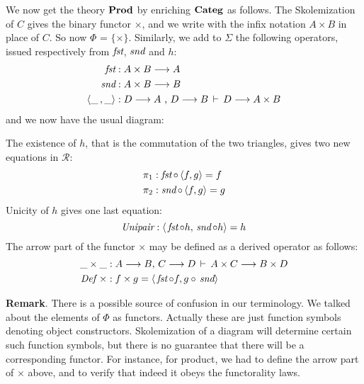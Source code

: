 \begin{center}
\end{center}

We now get the theory ${\mathbf {Prod}}$ by enriching ${\mathbf {Categ}}$ as follows. The Skolemization of $C$ gives the
binary functor $\times$, and we write with the infix notation 
$A \times B$ in place of $C$. So now $\Phi$ = $\{\times\}$.
Similarly, we add to $\Sigma$ the following operators,
issued respectively from $\mathop{\text{\it fst}}$, $\mathop{\text{\it snd}}$ and $h$:
\begin{align*}
\mathop{\text{\it fst}} &: A \times B \longrightarrow A\\
\mathop{\text{\it snd}} &: A \times B \longrightarrow B\\
\langle \_\,, \_ \rangle &: D\longrightarrow A \text{ , } D \longrightarrow B \,\vdash\, D \longrightarrow A \times B
\end{align*}
and we now have the usual diagram:
\begin{center}
\end{center}
The existence of $h$, that is the commutation of the two triangles,
gives two new equations in $\mathcal R$:
\begin{align*}
\pi_1 &: \mathop{\text{\it fst}} \circ\, \langle f, g \rangle = f\\
\pi_2 &: \mathop{\text{\it snd}} \circ\, \langle f, g \rangle = g
\end{align*}
Unicity of $h$ gives one last equation:
\[
\text{\it Unipair} : \langle \,\mathop{\text{\it fst}} \circ h, \,\mathop{\text{\it snd}} \circ h \rangle = h
\]
The arrow part of the functor $\times$ may be defined as a derived operator as follows:
\begin{align*}
\_ \times \_  &: A\longrightarrow B , \, C \longrightarrow D \, \vdash \, A\times C \longrightarrow B \times D\\
\text{\it Def } \times &: f \times g = \langle \,\mathop{\text{\it fst}} \circ f, g\circ \, \mathop{\text{\it snd}} \rangle
\end{align*}

\bigskip\noindent
{\bf Remark}. There is a possible source of confusion in our terminology. We talked about the elements
of $\Phi$ as functors. Actually these are just function symbols denoting object constructors. 
Skolemization of a diagram will determine certain such function symbols,
but there is no guarantee that
there will be a corresponding functor. For instance,
for product, we had to define the arrow part
of $\times$ above, and to verify that indeed it obeys the functorality laws.

